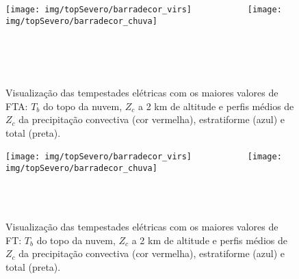 \begin{figure}[!ht]
\begin{flushleft}
  \texttt{[image: img/topSevero/barradecor\_virs]}~~~~~~~~~~~
  \texttt{[image: img/topSevero/barradecor\_chuva]}
\end{flushleft}
  \centering   
   \\
   \\
   \\
  \caption{Visualização das tempestades elétricas com os maiores valores de FTA: $T_b$ do topo da nuvem, $Z_c$ a 2 km de altitude e perfis médios de $Z_c$ da precipitação convectiva (cor vermelha), estratiforme (azul) e total (preta).} %
\label{topFTA}
\end{figure}

\begin{figure}[!ht]
 \begin{flushleft}
  \texttt{[image: img/topSevero/barradecor\_virs]}~~~~~~~~~~~
  \texttt{[image: img/topSevero/barradecor\_chuva]}
 \end{flushleft}
  \centering            
   \\
   \\
 
  \caption{Visualização das tempestades elétricas com os maiores valores de FT: $T_b$ do topo da nuvem, $Z_c$ a 2 km de altitude e perfis médios de $Z_c$ da precipitação convectiva (cor vermelha), estratiforme (azul) e total (preta).} %
\label{topFT}
\end{figure}

